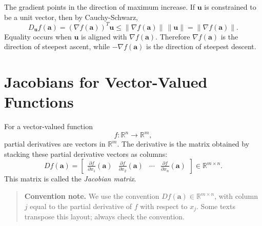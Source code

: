 The gradient points in the direction of maximum increase. If \(\mathbf{u}\) is constrained to be a unit vector, then by Cauchy-Schwarz,
\[
    D_{\mathbf{u}}f(\mathbf{a})
    =(\nabla f(\mathbf{a}))^T\mathbf{u}
    \leq \|\nabla f(\mathbf{a})\|\,\|\mathbf{u}\|
    =\|\nabla f(\mathbf{a})\|.
\]
Equality occurs when \(\mathbf{u}\) is aligned with \(\nabla f(\mathbf{a})\). Therefore \(\nabla f(\mathbf{a})\) is the direction of steepest ascent, while \(-\nabla f(\mathbf{a})\) is the direction of steepest descent.

\section{Jacobians for Vector-Valued Functions}
\label{mf:jacobian}

For a vector-valued function
\[
    f:\mathbb{R}^n\to\mathbb{R}^m,
\]
partial derivatives are vectors in \(\mathbb{R}^m\). The derivative is the matrix obtained by stacking these partial derivative vectors as columns:
\[
    Df(\mathbf{a})=\begin{bmatrix}
        \frac{\partial f}{\partial x_1}(\mathbf{a}) &
        \frac{\partial f}{\partial x_2}(\mathbf{a}) &
        \cdots &
        \frac{\partial f}{\partial x_n}(\mathbf{a})
    \end{bmatrix}
    \in\mathbb{R}^{m\times n}.
\]
This matrix is called the \emph{Jacobian matrix}.

\begin{quote}
\textbf{Convention note.} We use the convention \(Df(\mathbf{a})\in\mathbb{R}^{m\times n}\), with column \(j\) equal to the partial derivative of \(f\) with respect to \(x_j\). Some texts transpose this layout; always check the convention.
\end{quote}

